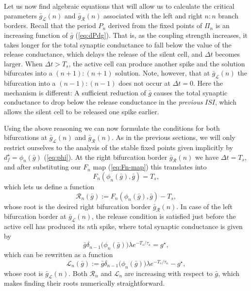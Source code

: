 Let us now find algebraic equations that will allow us to calculate the critical parameters $\bar g_{\mathcal{L}}(n)$ and $\bar g_{\mathcal{R}}(n)$ associated with the left and right $n:n$ branch borders.
Recall that the period $P_n$ derived from the fixed points of $\Pi_n$ is an increasing function of $\bar g$ (\cref{eq:dPdg}).
That is, as the coupling strength increases, it takes longer for the total synaptic conductance to fall below the value of the release conductance, which delays the release of the silent cell, and $\Delta t$ becomes larger.
When $\Delta t > T_{s}$, the active cell can produce another spike and the solution bifurcates into a $(n+1):(n+1)$ solution.
Note, however, that at $\bar g_{\mathcal{L}}(n)$ the bifurcation into a $(n-1):(n-1)$ does not occur at $\Delta t = 0$.
Here the mechanism is different: A sufficient reduction of $\bar g$ causes the total synaptic conductance to drop below the release conductance in the \emph{previous} $ISI$, which allows the silent cell to be released one spike earlier.

Using the above reasoning we can now formulate the conditions for both bifurcations at $\bar g_{\mathcal{L}}(n)$ and $\bar g_{\mathcal{R}}(n)$.
As in the previous sections, we will only restrict ourselves to the analysis of the stable fixed points given implicitly by $d^\star_f=\phi_n(\bar g)$ (\cref{eq:phi}).
At the right bifurcation border $\bar g_{\mathcal{R}}(n)$ we have $\Delta t=T_{s}$, and after substituting our $F_n$ map (\cref{eq:Fn-map}) this translates into
\begin{equation}
	F_n(\phi_n(\bar g), \bar g) = T_{s},
\end{equation}
which lets us define a function
\begin{equation}
	\label{eq:R}
	\mathcal{R}_{n}(\bar g):=F_n(\phi_n(\bar g), \bar g)-T_{s},
\end{equation}
whose root is the desired right bifurcation border $\bar g_{\mathcal{R}}(n)$.
In case of the left bifurcation border at $\bar g_{\mathcal{L}}(n)$, the release condition is satisfied just before the active cell has produced its $n$th spike, where total synaptic conductance is given by
\begin{equation}
	\bar g \delta_{n-1}\big(\phi_n(\bar g)\big)\lambda e^{-T_{s}/\tau_\kappa} = g^\star,
\end{equation}
which can be rewritten as a function
\begin{equation}
	\label{eq:L}
	\mathcal{L}_n(\bar g):=\bar g \delta_{n-1}\big(\phi_n(\bar g)\big)\lambda e^{-T_{s}/\tau_\kappa} -g^\star,
\end{equation}
whose root is $\bar g_{\mathcal{L}}(n)$.
Both $\mathcal{R}_n$ and $\mathcal{L}_n$ are increasing with respect to $\bar g$, which makes finding their roots numerically straightforward.

